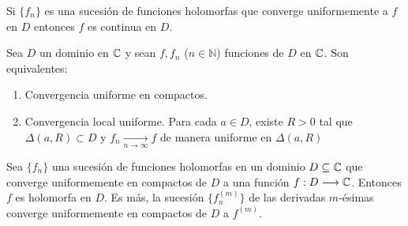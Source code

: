 \begin{obs}
    Si $\{f_n\}$ es una sucesión de funciones holomorfas que converge uniformemente a $f$ en $D$ entonces $f$ es continua en $D$.
\end{obs}

\begin{lema}
    Sea $D$ un dominio en $\mathbb{C}$ y sean $f,f_n$ ($n \in \mathbb{N}$) funciones de $D$ en $\mathbb{C}$. Son equivalentes:
    \begin{enumerate}
        \item Convergencia uniforme en compactos.
        \item Convergencia local uniforme. Para cada $a \in D$, existe $R > 0$ tal que $\Delta(a,R) \subset D$ y $f_n \xrightarrow[n \to \infty]{} f$ de manera uniforme en $\Delta(a,R)$
    \end{enumerate}
\end{lema}

\begin{teo}
    Sea $\{f_n\}$ una sucesión de funciones holomorfas en un dominio $D \subseteq \mathbb{C}$ que converge uniformemente en compactos de $D$ a una función $f: D \longrightarrow \mathbb{C}$. Entonces $f$ es holomorfa en $D$. Es más, la sucesión $\{f_n^{(m)}\}$ de las derivadas $m$-ésimas converge uniformemente en compactos de $D$ a $f^{(m)}$.
\end{teo}

